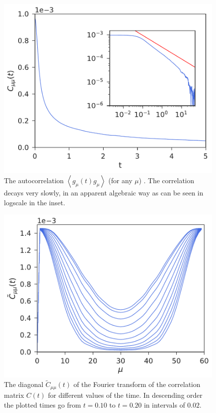 \documentclass[a4paper,openright,12pt]{book}
\newcommand{\llangle}{\left\langle}
\newcommand{\rrangle}{\right\rangle}
\begin{document}
\begin{figure}[h!]
\centering
\includegraphics[scale=0.45]{Ct-mu30nu30-PBC}
\caption[Autocorrelation for PBC system.]{The autocorrelation
  $\llangle g_{\mu}(t) g_\mu\rrangle$ (for  any $\mu$)
  . The correlation  decays very
slowly, in an  apparent algebraic way as can be  seen in logscale in the inset.}
  \label{fig:Autocorrelation-PBC}
\end{figure}


\begin{figure}[h!]
  \centering
  \includegraphics[scale=0.45]{CtFourier-PBC}
  \caption[Diagonal $\tilde{C}_{\mu\nu}(t)$ for PBC]{The diagonal $\tilde{C}_{\mu\mu}(t)$ of the Fourier transform
  of the correlation  matrix $C(t)$ for different values  of the time.
In      descending     order      the     plotted      times go from $t=0.10$ to $t=0.20$ in intervals of $0.02$. }
\label{fig:CtFourier-PBC}
\end{figure}
\end{document}
